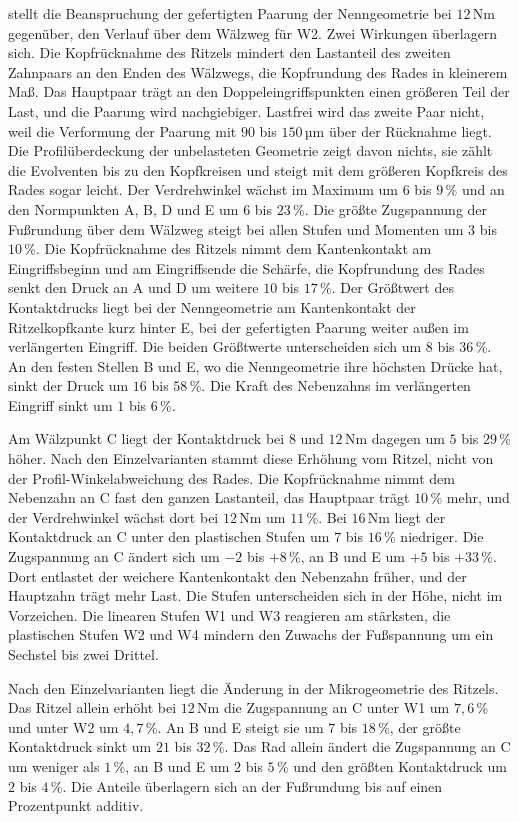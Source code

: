  stellt die Beanspruchung der gefertigten Paarung der Nenngeometrie bei $12$\,Nm gegenüber,  den Verlauf über dem Wälzweg für W2. Zwei Wirkungen überlagern sich. Die Kopfrücknahme des Ritzels mindert den Lastanteil des zweiten Zahnpaars an den Enden des Wälzwegs, die Kopfrundung des Rades in kleinerem Maß. Das Hauptpaar trägt an den Doppeleingriffspunkten einen größeren Teil der Last, und die Paarung wird nachgiebiger. Lastfrei wird das zweite Paar nicht, weil die Verformung der Paarung mit $90$ bis $150$\,µm über der Rücknahme liegt. Die Profilüberdeckung der unbelasteten Geometrie zeigt davon nichts, sie zählt die Evolventen bis zu den Kopfkreisen und steigt mit dem größeren Kopfkreis des Rades sogar leicht. Der Verdrehwinkel wächst im Maximum um $6$ bis $9$\,\% und an den Normpunkten A, B, D und E um $6$ bis $23$\,\%. Die größte Zugspannung der Fußrundung über dem Wälzweg steigt bei allen Stufen und Momenten um $3$ bis $10$\,\%. Die Kopfrücknahme des Ritzels nimmt dem Kantenkontakt am Eingriffsbeginn und am Eingriffsende die Schärfe, die Kopfrundung des Rades senkt den Druck an A und D um weitere $10$ bis $17$\,\%. Der Größtwert des Kontaktdrucks liegt bei der Nenngeometrie am Kantenkontakt der Ritzelkopfkante kurz hinter E, bei der gefertigten Paarung weiter außen im verlängerten Eingriff. Die beiden Größtwerte unterscheiden sich um $8$ bis $36$\,\%. An den festen Stellen B und E, wo die Nenngeometrie ihre höchsten Drücke hat, sinkt der Druck um $16$ bis $58$\,\%. Die Kraft des Nebenzahns im verlängerten Eingriff sinkt um $1$ bis $6$\,\%.

Am Wälzpunkt C liegt der Kontaktdruck bei $8$ und $12$\,Nm dagegen um $5$ bis $29$\,\% höher. Nach den Einzelvarianten stammt diese Erhöhung vom Ritzel, nicht von der Profil-Winkelabweichung des Rades. Die Kopfrücknahme nimmt dem Nebenzahn an C fast den ganzen Lastanteil, das Hauptpaar trägt $10$\,\% mehr, und der Verdrehwinkel wächst dort bei $12$\,Nm um $11$\,\%. Bei $16$\,Nm liegt der Kontaktdruck an C unter den plastischen Stufen um $7$ bis $16$\,\% niedriger. Die Zugspannung an C ändert sich um $-2$ bis $+8$\,\%, an B und E um $+5$ bis $+33$\,\%. Dort entlastet der weichere Kantenkontakt den Nebenzahn früher, und der Hauptzahn trägt mehr Last. Die Stufen unterscheiden sich in der Höhe, nicht im Vorzeichen. Die linearen Stufen W1 und W3 reagieren am stärksten, die plastischen Stufen W2 und W4 mindern den Zuwachs der Fußspannung um ein Sechstel bis zwei Drittel.

Nach den Einzelvarianten liegt die Änderung in der Mikrogeometrie des Ritzels. Das Ritzel allein erhöht bei $12$\,Nm die Zugspannung an C unter W1 um $7{,}6$\,\% und unter W2 um $4{,}7$\,\%. An B und E steigt sie um $7$ bis $18$\,\%, der größte Kontaktdruck sinkt um $21$ bis $32$\,\%. Das Rad allein ändert die Zugspannung an C um weniger als $1$\,\%, an B und E um $2$ bis $5$\,\% und den größten Kontaktdruck um $2$ bis $4$\,\%. Die Anteile überlagern sich an der Fußrundung bis auf einen Prozentpunkt additiv.

